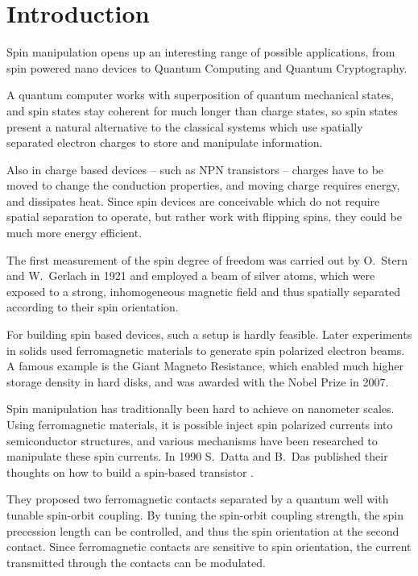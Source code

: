 \chapter{Introduction}

Spin manipulation opens up an interesting range of possible applications, from
spin powered nano devices to Quantum Computing and Quantum Cryptography.

A quantum computer works with superposition of quantum mechanical states, and
spin states stay coherent for much longer than charge states, so spin states
present a natural alternative to the classical systems which use spatially
separated electron charges to store and manipulate information.

Also in charge based devices -- such as NPN transistors -- charges have to be
moved to change the conduction properties, and moving charge requires energy,
and dissipates heat. Since spin devices are conceivable which do not require
spatial separation to operate, but rather work with flipping spins, they could
be much more energy efficient.

The first measurement of the spin degree of freedom was carried out by O.~Stern
and W.~Gerlach in 1921 \cite{stern-gerlach} and employed a beam of silver atoms,
which were
exposed to a strong, inhomogeneous magnetic field and thus spatially separated
according to their spin orientation.

For building spin based devices, such a setup is hardly feasible. Later
experiments in solids used ferromagnetic materials to generate spin polarized
electron beams. A famous example is the Giant Magneto Resistance, which
enabled much higher storage density in hard disks, and was awarded with the
Nobel Prize in 2007.

Spin manipulation has traditionally been hard to achieve on nanometer
scales. Using ferromagnetic materials, it is possible inject spin polarized
currents into semiconductor structures, and various mechanisms have been
researched to manipulate these spin currents. In 1990 S.~Datta and B.~Das
published their thoughts on how to build a spin-based
transistor \cite{datta-das}.

They proposed two ferromagnetic contacts separated
by a quantum well with tunable spin-orbit coupling. By tuning the spin-orbit
coupling strength, the spin precession length can be controlled, and thus the
spin orientation at the second contact. Since ferromagnetic contacts are
sensitive to spin orientation, the current transmitted through the contacts can be
modulated.

